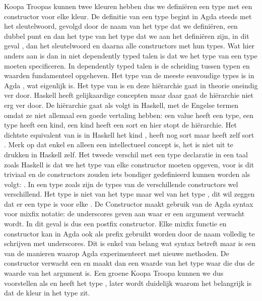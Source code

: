 Koopa Troopas kunnen twee kleuren hebben dus we definiëren een type
 met een constructor voor elke kleur. De definitie van een type
begint in Agda steeds met het  sleutelwoord, gevolgd door de naam
van het type dat we definiëren, een dubbel punt en dan het type van het type
dat we aan het definiëren zijn, in dit geval , dan het sleutelwoord
 en daarna alle constructors met hun types. Wat hier anders aan is
dan in niet dependently typed talen is dat we het type van een type moeten
specificeren. In dependently typed talen is de scheiding tussen typen en
waarden fundamenteel opgeheven. Het type van de meeste eenvoudige types is in
Agda , wat eigenlijk  is. Het type van  is
 en deze hiërarchie gaat in theorie oneindig ver door. Haskell heeft
gelijkaardige concepten maar daar gaat de hiërarchie niet erg ver door. De
hiërarchie gaat als volgt in Haskell, met de Engelse termen omdat ze niet
allemaal een goede vertaling hebben: een value heeft een type, een type heeft
een kind, een kind heeft een sort en hier stopt de hiërarchie. Het dichtste
equivalent van  is in Haskell het kind \ihask{*}, \ihask{*} heeft
nog sort  maar  heeft zelf sort . Merk op dat
 enkel en alleen een intellectueel concept is, het is niet uit te
drukken in Haskell zelf.
Het tweede verschil met een type declaratie in een taal zoals Haskell is dat
we het type van elke constructor moeten opgeven, voor  is dit
triviaal en de constructors zouden iets bondiger gedefinieerd kunnen worden als
volgt: . In een type zoals  zijn de types
van de verschillende constructors wel verschillend. Het type
 is niet van het type  maar wel van het type
, dit wil zeggen dat er een type is voor elke .
De Constructor maakt gebruik van de Agda syntax voor mixfix notatie: de
underscores geven aan waar er een argument verwacht wordt. In dit geval is
 dus een postfix constructor. Elke mixfix functie en constructor kan
in Agda ook als prefix gebruikt worden door de naam volledig te schrijven met
underscores. Dit is enkel van belang wat syntax betreft maar is een van de
manieren waarop Agda experimenteert met nieuwe methoden. De 
constructor verwacht een  en maakt dan een waarde van het type
 waar die  dus de waarde van het argument is. Een
groene Koopa Troopa kunnen we dus voorstellen als  en heeft het
type , later wordt duidelijk waarom het belangrijk is
dat de kleur in het type zit.


